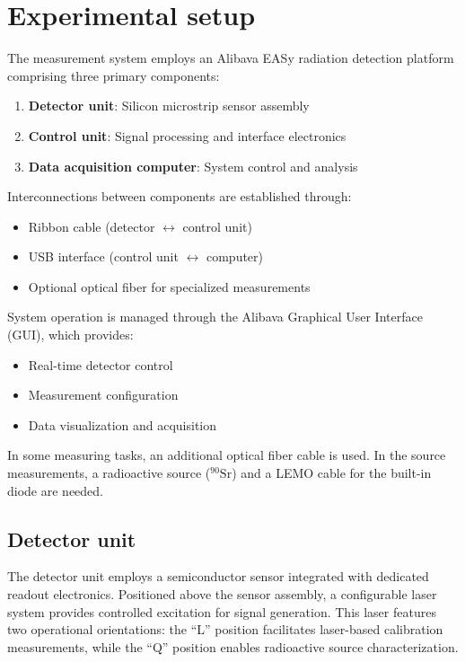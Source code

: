 \chapter{Experimental setup}\label{chap:02}

The measurement system employs an Alibava EASy radiation detection platform comprising three primary components:
\begin{enumerate}
    \item \textbf{Detector unit}: Silicon microstrip sensor assembly
    \item \textbf{Control unit}: Signal processing and interface electronics
    \item \textbf{Data acquisition computer}: System control and analysis
\end{enumerate}

Interconnections between components are established through:
\begin{itemize}
    \item Ribbon cable (detector $\leftrightarrow$ control unit)
    \item USB interface (control unit $\leftrightarrow$ computer)
    \item Optional optical fiber for specialized measurements
\end{itemize}

System operation is managed through the Alibava Graphical User Interface (GUI), which provides:
\begin{itemize}
    \item Real-time detector control
    \item Measurement configuration
    \item Data visualization and acquisition
\end{itemize}

In some measuring tasks, an additional optical fiber cable is used. In the source measurements, a radioactive source ($^{90}\mathrm{Sr}$) and a LEMO cable for the built-in diode are needed.
\section{Detector unit}

The detector unit employs a semiconductor sensor integrated with dedicated readout electronics. Positioned above the sensor assembly, a configurable laser system provides controlled excitation for signal generation. This laser features two operational orientations: the \enquote{L} position facilitates laser-based calibration measurements, while the \enquote{Q} position enables radioactive source characterization. 

